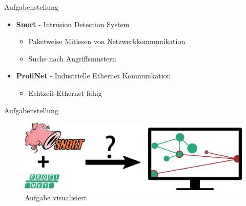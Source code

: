 \begin{frame}{Aufgabenstellung}
\begin{itemize}[<+->]
  \item \textbf{Snort} - Intrusion Detection System
    \begin{itemize}
      \item Paketweise Mitlesen von Netzwerkkommunikation
      \item Suche nach Angriffsmustern
    \end{itemize}
  \item \textbf{ProfiNet} - Industrielle Ethernet Kommunkation
    \begin{itemize}
      \item Echtzeit-Ethernet fähig
    \end{itemize}
\end{itemize}
\end{frame}

\begin{frame}{Aufgabenstellung}
\begin{figure}
  \centering
  \includegraphics[width=\textwidth]{./images/aufgabestellung.jpg}
  \caption{Aufgabe visualisiert}
\end{figure}
\end{frame}